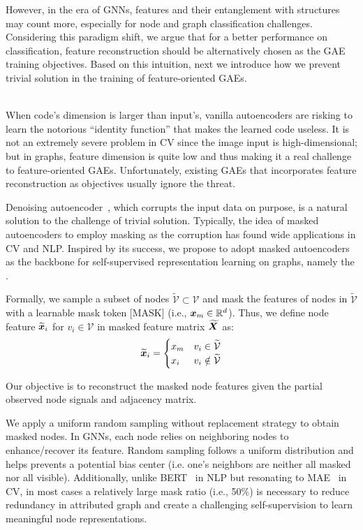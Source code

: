 {However, in the era of GNNs, features and their entanglement with structures may count more, especially for node and graph classification challenges. Considering this paradigm shift, we argue that for a better performance on classification, feature reconstruction should be alternatively chosen as the GAE training objectives. Based on this intuition, next we introduce how we prevent trivial solution in the training of feature-oriented GAEs.

~\\
When code's dimension is larger than input's, vanilla autoencoders are risking to learn the notorious ``identity function'' that makes the learned code useless. It is not an extremely severe problem in CV since the image input is high-dimensional; but in graphs, feature dimension is quite low and thus making it a real challenge to feature-oriented GAEs. Unfortunately, existing GAEs that incorporates feature reconstruction as objectives usually ignore the threat.

Denoising autoencoder~\cite{vincent2008extracting}, which corrupts the input data on purpose, is a natural solution to the challenge of trivial solution. Typically, the idea of masked autoencoders to employ masking as the corruption has found wide applications in CV and NLP. Inspired by its success, we propose to adopt masked autoencoders as the backbone for self-supervised representation learning on graphs, namely the \model.

 Formally, we sample a subset of nodes $\widetilde{\mathcal{V}}\subset\mathcal{V}$ and mask the features of nodes in $\widetilde{\mathcal{V}}$ with a learnable mask token [MASK] (i.e., ${\bm{x}}_m\in \mathbb{R}^{d}$). Thus, we define node feature $\widetilde{{\bm{x}}}_{i}$ for $v_i\in\mathcal{V}$ in masked feature matrix $\widetilde{{\bm{X}}}$ as:
\begin{equation}
\widetilde{{\bm{x}}}_{i}=
\begin{cases}
x_m & v_i\in\widetilde{\mathcal{V}} \\
x_i & v_i\notin\widetilde{\mathcal{V}} 
\end{cases}
\end{equation}
 
\noindent Our objective is to reconstruct the masked node features given the partial observed node signals and adjacency matrix.  

We apply a uniform random sampling without replacement strategy to obtain masked nodes. In GNNs, each node relies on neighboring nodes to enhance/recover its feature. Random sampling follows a uniform distribution and helps prevents a potential bias center (i.e. one's neighbors are neither all masked nor all visible). Additionally, unlike BERT~\cite{devlin2019bert} in NLP but resonating to MAE~\cite{he2021masked} in CV, in most cases a relatively large mask ratio (i.e., 50\%) is necessary to reduce redundancy in attributed graph and create a challenging self-supervision to learn meaningful node representations. 

}
